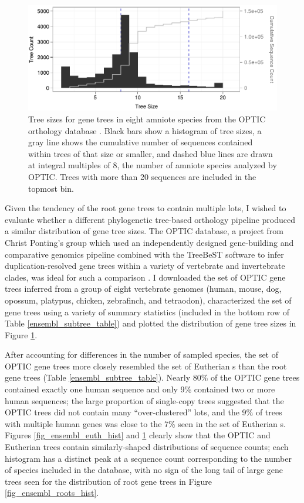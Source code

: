 \begin{figure}
\centering
\includegraphics[scale=0.9]{Figs/hist_optic_roots.pdf}
\caption{Tree sizes for gene trees in eight amniote species from
  the OPTIC orthology database \citep{Heger2008}. Black bars show a
  histogram of tree sizes, a gray line shows the cumulative
  number of sequences contained within trees of that size or
  smaller, and dashed blue lines are drawn at integral multiples of 8,
  the number of amniote species analyzed by OPTIC. Trees with more
  than 20 sequences are included in the topmost bin.}
\label{fig_optic_roots_hist}
\end{figure}

Given the tendency of the root \cmp gene trees to contain multiple
\mammln \acp{lot}, I wished to evaluate whether a different
phylogenetic tree-based orthology pipeline produced a similar
distribution of gene tree sizes. The OPTIC database, a project from
Christ Ponting's group which used an independently designed
gene-building and comparative genomics pipeline combined with the
TreeBeST software to infer duplication-resolved gene trees within a
variety of vertebrate and invertebrate clades, was ideal for such a
comparison \citep{Heger2008}. I downloaded the set of OPTIC gene trees
inferred from a group of eight vertebrate genomes (human, mouse, dog,
opossum, platypus, chicken, zebrafinch, and tetraodon), characterized
the set of gene trees using a variety of summary statistics (included
in the bottom row of Table \ref{ensembl_subtree_table}) and plotted the
distribution of gene tree sizes in Figure \ref{fig_optic_roots_hist}.

After accounting for differences in the number of sampled species, the
set of OPTIC gene trees more closely resembled the set of Eutherian
\subtr{}s than the root \cmp gene trees (Table
\ref{ensembl_subtree_table}). Nearly 80\% of the OPTIC gene trees
contained exactly one human sequence and only 9\% contained two or
more human sequences; the large proportion of single-copy trees
suggested that the OPTIC trees did not contain many ``over-clustered''
\mammln \acp{lot}, and the 9\% of trees with multiple human genes was
close to the 7\% seen in the set of Eutherian \subtr{}s. Figures
\ref{fig_ensembl_euth_hist} and \ref{fig_optic_roots_hist} clearly show that
the OPTIC and Eutherian trees contain similarly-shaped distributions
of sequence counts; each histogram has a distinct peak at a sequence
count corresponding to the number of species included in the database,
with no sign of the long tail of large gene trees seen for the
distribution of root \cmp gene trees in Figure
\ref{fig_ensembl_roots_hist}.

